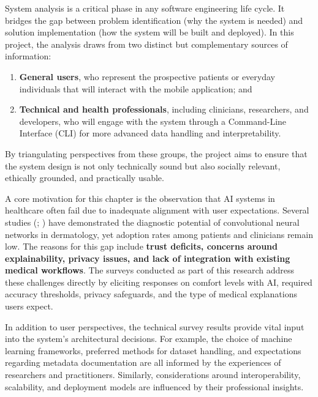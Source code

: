 \documentclass[
  12pt,
  oneside]{article}
\providecommand{\tightlist}{%
  \setlength{\itemsep}{0pt}\setlength{\parskip}{0pt}}
\begin{document}
System analysis is a critical phase in any software engineering life
cycle. It bridges the gap between problem identification (why the system
is needed) and solution implementation (how the system will be built and
deployed). In this project, the analysis draws from two distinct but
complementary sources of information:

\begin{enumerate}
\def\labelenumi{\arabic{enumi}.}
\tightlist
\item
  \textbf{General users}, who represent the prospective patients or
  everyday individuals that will interact with the mobile application;
  and\\
\item
  \textbf{Technical and health professionals}, including clinicians,
  researchers, and developers, who will engage with the system through a
  Command-Line Interface (CLI) for more advanced data handling and
  interpretability.
\end{enumerate}

By triangulating perspectives from these groups, the project aims to
ensure that the system design is not only technically sound but also
socially relevant, ethically grounded, and practically usable.

A core motivation for this chapter is the observation that AI systems in
healthcare often fail due to inadequate alignment with user
expectations. Several studies
(;
) have demonstrated
the diagnostic potential of convolutional neural networks in
dermatology, yet adoption rates among patients and clinicians remain
low. The reasons for this gap include \textbf{trust deficits, concerns
around explainability, privacy issues, and lack of integration with
existing medical workflows}. The surveys conducted as part of this
research address these challenges directly by eliciting responses on
comfort levels with AI, required accuracy thresholds, privacy
safeguards, and the type of medical explanations users expect.

In addition to user perspectives, the technical survey results provide
vital input into the system's architectural decisions. For example, the
choice of machine learning frameworks, preferred methods for dataset
handling, and expectations regarding metadata documentation are all
informed by the experiences of researchers and practitioners. Similarly,
considerations around interoperability, scalability, and deployment
models are influenced by their professional insights.
\end{document}

